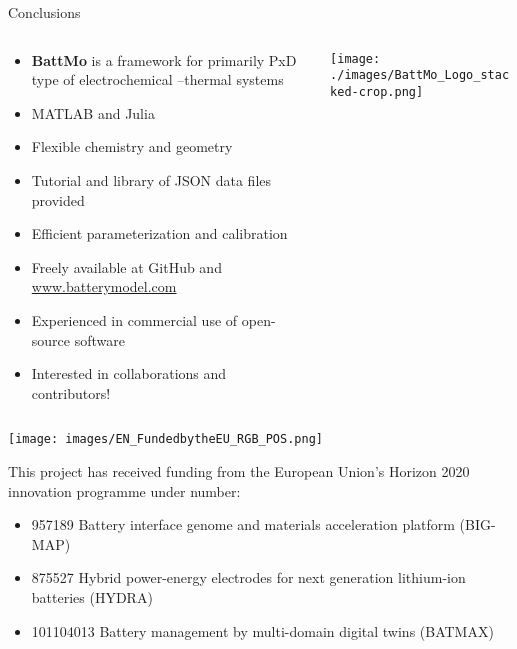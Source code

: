\documentclass{beamer}
\begin{document}
\begin{frame}{Conclusions}

\footnotesize

\begin{columns}%
  \begin{column}{0.6\linewidth}
    \begin{itemize}
    \item {\bf BattMo} is a framework for primarily PxD type of electrochemical --thermal systems
    \item MATLAB and Julia
    \item Flexible chemistry and geometry
    \item Tutorial and library of JSON data files provided
    \item Efficient parameterization and calibration
    \item Freely available at GitHub and \url{www.batterymodel.com}
    \item Experienced in commercial use of open-source software
    \item Interested in collaborations and contributors!
    \end{itemize}
  \end{column}
  \begin{column}{0.4\linewidth}
    \centering
    \texttt{[image: ./images/BattMo\_Logo\_stacked-crop.png]}
    \scriptsize
  \end{column}
\end{columns}

\vspace{0.5cm}

{
\tiny
\texttt{[image: images/EN\_FundedbytheEU\_RGB\_POS.png]}

This project has received funding from the European Union’s Horizon
2020 innovation programme under number:
\begin{itemize}
\item 957189 Battery interface genome and materials acceleration platform (BIG-MAP)
\item 875527 Hybrid power-energy electrodes for next generation lithium-ion batteries (HYDRA)
\item 101104013 Battery management by multi-domain digital twins (BATMAX)
\end{itemize}
}


\end{frame}

\backmatter
\end{document}
